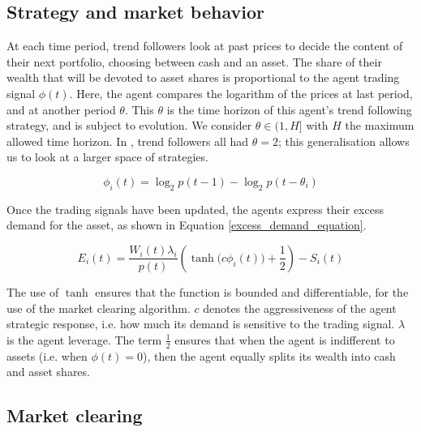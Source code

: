 \documentclass{article}
\begin{document}
\subsection{Strategy and market behavior}
At each time period, trend followers look at past prices to decide the content of their next portfolio, choosing between cash and an asset. The share of their wealth that will be devoted to asset shares is proportional to the agent trading signal $\phi(t)$. Here, the agent compares the logarithm of the prices at last period, and at another period $\theta$. This $\theta$ is the time horizon of this agent's trend following strategy, and is subject to evolution. We consider $\theta \in (1, H]$ with $H$ the maximum allowed time horizon. In \cite{scholl2020market}, trend followers all had $\theta = 2$; this generalisation allows us to look at a larger space of strategies.

\begin{equation}
    \label{trend_following_equation}
    \phi_i(t) = \log_2 p(t-1) - \log_2 p(t-\theta_i)
\end{equation}

Once the trading signals have been updated, the agents express their excess demand for the asset, as shown in Equation \ref{excess_demand_equation}. 

\begin{equation}
\label{excess_demand_equation}
   E_i(t) = \frac{W_i(t) {\lambda_i}}{p(t)} \left( \tanh{({c} \phi_i(t)}) + \frac{1}{2} \right) - S_i(t)
\end{equation}

The use of $\tanh$ ensures that the function is bounded and differentiable, for the use of the market clearing algorithm. $c$ denotes the aggressiveness of the agent strategic response, i.e. how much its demand is sensitive to the trading signal. $\lambda$ is the agent leverage. The term $\frac{1}{2}$ ensures that when the agent is indifferent to assets (i.e. when $\phi(t) = 0$), then the agent equally splits its wealth into cash and asset shares.

\subsection{Market clearing}
\end{document}
